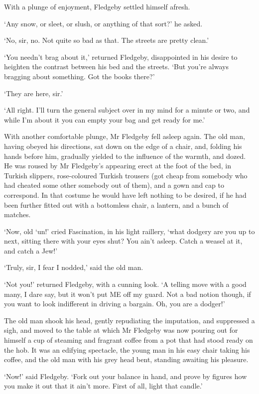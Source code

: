 With a plunge of enjoyment, Fledgeby settled himself afresh.

‘Any snow, or sleet, or slush, or anything of that sort?’ he asked.

‘No, sir, no. Not quite so bad as that. The streets are pretty clean.’

‘You needn’t brag about it,’ returned Fledgeby, disappointed in his
desire to heighten the contrast between his bed and the streets. ‘But
you’re always bragging about something. Got the books there?’

‘They are here, sir.’

‘All right. I’ll turn the general subject over in my mind for a minute
or two, and while I’m about it you can empty your bag and get ready for
me.’

With another comfortable plunge, Mr Fledgeby fell asleep again. The old
man, having obeyed his directions, sat down on the edge of a chair, and,
folding his hands before him, gradually yielded to the influence of the
warmth, and dozed. He was roused by Mr Fledgeby’s appearing erect at
the foot of the bed, in Turkish slippers, rose-coloured Turkish trousers
(got cheap from somebody who had cheated some other somebody out of
them), and a gown and cap to correspond. In that costume he would have
left nothing to be desired, if he had been further fitted out with a
bottomless chair, a lantern, and a bunch of matches.

‘Now, old ‘un!’ cried Fascination, in his light raillery, ‘what dodgery
are you up to next, sitting there with your eyes shut? You ain’t asleep.
Catch a weasel at it, and catch a Jew!’

‘Truly, sir, I fear I nodded,’ said the old man.

‘Not you!’ returned Fledgeby, with a cunning look. ‘A telling move with
a good many, I dare say, but it won’t put ME off my guard. Not a bad
notion though, if you want to look indifferent in driving a bargain. Oh,
you are a dodger!’

The old man shook his head, gently repudiating the imputation, and
suppressed a sigh, and moved to the table at which Mr Fledgeby was now
pouring out for himself a cup of steaming and fragrant coffee from a pot
that had stood ready on the hob. It was an edifying spectacle, the young
man in his easy chair taking his coffee, and the old man with his grey
head bent, standing awaiting his pleasure.

‘Now!’ said Fledgeby. ‘Fork out your balance in hand, and prove by
figures how you make it out that it ain’t more. First of all, light that
candle.’

